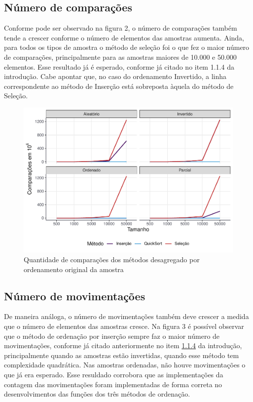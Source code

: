 \documentclass[
]{article}
\begin{document}
\hypertarget{nuxfamero-de-comparauxe7uxf5es}{%
\subsection{Número de
comparações}\label{nuxfamero-de-comparauxe7uxf5es}}

Conforme pode ser observado na figura 2, o número de comparações também
tende a crescer conforme o número de elementos das amostras aumenta.
Ainda, para todos os tipos de amostra o método de seleção foi o que fez
o maior número de comparações, principalmente para as amostras maiores
de 10.000 e 50.000 elementos. Esse resultado já é esperado, conforme já
citado no item 1.1.4 da introdução. Cabe apontar que, no caso do
ordenamento Invertido, a linha correspondente ao método de Inserção está
sobreposta àquela do método de Seleção.

\begin{figure}

{\centering \includegraphics[width=0.75\linewidth]{relatorio_tp1_2_files/figure-latex/grafico-comparacoes-1} 

}

\caption{Quantidade de comparações dos métodos desagregado por ordenamento original da amostra}\label{fig:grafico-comparacoes}
\end{figure}

\break

\hypertarget{nuxfamero-de-movimentauxe7uxf5es}{%
\subsection{Número de
movimentações}\label{nuxfamero-de-movimentauxe7uxf5es}}

De maneira análoga, o número de movimentações também deve crescer a
medida que o número de elementos das amostras cresce. Na figura 3 é
possível observar que o método de ordenação por inserção sempre faz o
maior número de movimentações, conforme já citado anteriormente no item
\protect\hyperlink{sec144}{1.1.4} da introdução, principalmente quando
as amostras estão invertidas, quando esse método tem complexidade
quadrática. Nas amostras ordenadas, não houve movimentações o que já era
esperado. Esse resuldado corrobora que as implementações da contagem das
movimentações foram implementadas de forma correta no desenvolvimentos
das funções dos três métodos de ordenação.
\end{document}

